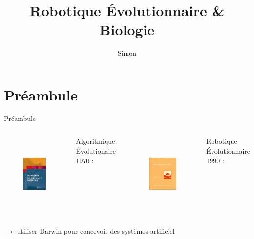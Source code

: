 \documentclass[8pt]{beamer}
\author{Simon}
\title{Robotique Évolutionnaire \& Biologie }
\begin{document}
\begin{frame}
	\titlepage
\end{frame}
\section{Préambule}
\begin{frame}{Préambule}

	\vfill
	\begin{columns}
		\begin{figure}[h]
			\begin{center}
				\includegraphics[height=4cm]{images/ec}
			\end{center}
			\caption{\cite{eiben03introductiontoevolutionarycomputing}}
			\label{fig:ec}
		\end{figure} 

		\vfill
		Algoritmique Évolutionaire 1970 : \cite{holland75adaptationnaturalartificialsystem}




		\begin{figure}[h]
			\begin{center}
				\includegraphics[height=4cm]{images/er}
			\end{center}
			\caption{\cite{nolfi00evolrobobiolintetechselfmach}}
			\label{fig:er}
		\end{figure}

		\vfill
		Robotique Évolutionnaire 1990 : \cite{nolfi00evolrobobiolintetechselfmach}
	\end{columns}
	\vfill

	$\rightarrow$ utiliser Darwin pour concevoir des systèmes artificiel
\end{frame}
\end{document}
